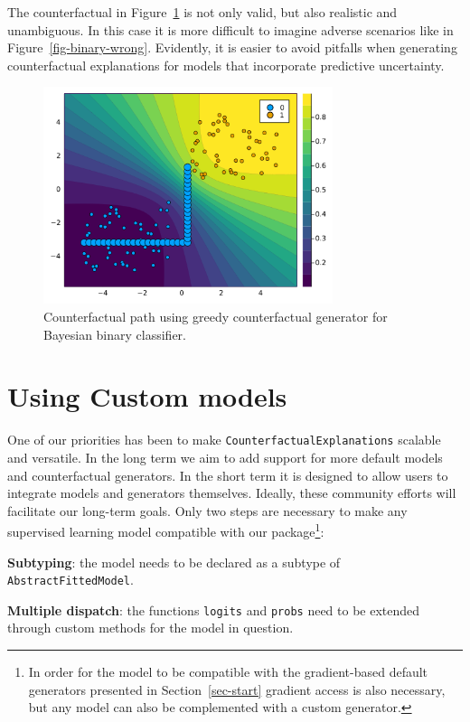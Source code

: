 \documentclass{juliacon}
\begin{document}
The counterfactual in Figure~\ref{fig-binary-laplace} is not only valid,
but also realistic and unambiguous. In this case it is more difficult to
imagine adverse scenarios like in Figure~\ref{fig-binary-wrong}.
Evidently, it is easier to avoid pitfalls when generating counterfactual
explanations for models that incorporate predictive uncertainty.

\begin{figure}

{\centering \includegraphics[width=3.33333in,height=2.5in]{www/ce_binary_laplace.png}

}

\caption{\label{fig-binary-laplace}Counterfactual path using greedy
counterfactual generator for Bayesian binary classifier.}

\end{figure}

\hypertarget{sec-custom}{%
\section{Using Custom models}\label{sec-custom}}

One of our priorities has been to make
\texttt{CounterfactualExplanations} scalable and versatile. In the long
term we aim to add support for more default models and counterfactual
generators. In the short term it is designed to allow users to integrate
models and generators themselves. Ideally, these community efforts will
facilitate our long-term goals. Only two steps are necessary to make any
supervised learning model compatible with our package\footnote{In order
  for the model to be compatible with the gradient-based default
  generators presented in Section~\ref{sec-start} gradient access is
  also necessary, but any model can also be complemented with a custom
  generator.}:

\begin{unnumlist}
\item \textbf{Subtyping}: the model needs to be declared as a subtype of \texttt{AbstractFittedModel}.
\item \textbf{Multiple dispatch}: the functions \texttt{logits} and \texttt{probs} need to be extended through custom methods for the model in question.
\end{unnumlist}
\end{document}
